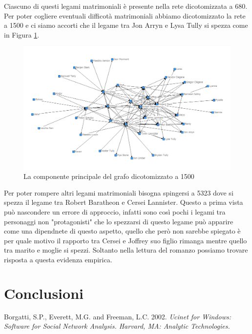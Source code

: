 \documentclass[a4paper]{article}
\begin{document}
Ciascuno di questi legami matrimoniali è presente nella rete dicotomizzata a 680.\\
Per poter cogliere eventuali difficotà matrimoniali abbiamo dicotomizzato la rete a 1500 e ci siamo accorti che il legame tra Jon Arryn e Lysa Tully si spezza come in Figura \ref{fig:grafo-partito-1500}.\\
\begin{figure}[h]
\centering
\includegraphics[width=.9\textwidth]{picture/030.png}
\caption{La componente principale del grafo dicotomizzato a 1500}
\label{fig:grafo-partito-1500}
\end{figure}
Per poter rompere altri legami matrimoniali bisogna spingersi a 5323 dove si spezza il legame tra Robert Baratheon e Cersei Lannister. Questo a prima vista può nascondere un errore di approccio, infatti sono così pochi i legami tra personaggi non "protagonisti" che lo spezzarsi di questo legame può apparire come una dipendnete di questo aspetto, quello che però non sarebbe spiegato è per quale motivo il rapporto tra Cersei e Joffrey suo figlio rimanga mentre quello tra marito e moglie si spezzi. Soltanto nella lettura del romanzo possiamo trovare risposta a questa evidenza empirica.






\section{Conclusioni}

\begin{thebibliography}{9}
  	Borgatti, S.P., Everett, M.G. and Freeman, L.C. 2002. 		\emph{Ucinet for Windows: Software for Social Network Analysis. Harvard, MA: Analytic Technologies.} 
\end{thebibliography}
\end{document}
